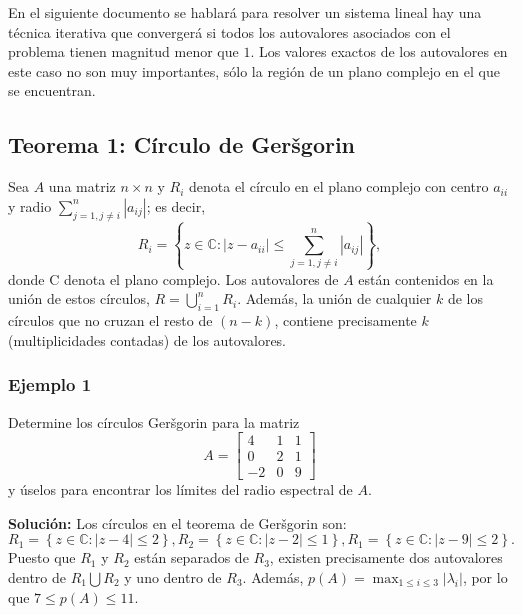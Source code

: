 \documentclass{report}
\numberwithin{subsection}{section} %
\begin{document}
En el siguiente documento se hablará para resolver un sistema lineal hay una técnica iterativa que convergerá si todos los autovalores asociados con el problema tienen magnitud menor que $ 1 $. Los valores exactos de los autovalores en este caso no son muy importantes, sólo la región de un plano complejo en el que se encuentran.

\subsection{\textnormal{Teorema 1: Círculo de Geršgorin}}

Sea $A$ una matriz $n\times n$ y $R_i$ denota el círculo en el plano complejo con centro $a_{ii}$ y radio $\sum_{j=1,j\neq i}^{n}\left| a_{ij} \right|$; es decir,
\begin{equation}
R_{i} = \left\{ z \in \mathbb{C} : \left| z - a_{ii} \right| \le \sum_{j=1,j\neq i}^{n}\left| a_{ij} \right| \right\},
\end{equation}
donde C denota el plano complejo. Los autovalores de $A$ están contenidos en la unión de estos círculos, $R=\bigcup_{i=1}^{n}R_{i}$. Además, la unión de cualquier $k$ de los círculos que no cruzan el resto de $\left( n - k \right)$, contiene precisamente $k$ (multiplicidades contadas) de los autovalores.

\subsubsection*{Ejemplo 1}

Determine los círculos Geršgorin para la matriz
\begin{equation*}
A =\begin{bmatrix}
4 & 1 & 1 \\
0 & 2 & 1 \\
-2 & 0 & 9
\end{bmatrix}
\end{equation*}
y úselos para encontrar los límites del radio espectral de $A$.

\textbf{Solución:} Los círculos en el teorema de Geršgorin son:
\begin{equation*}
R_{1} = \left\{ z \in \mathbb{C} : \left| z - 4 \right| \le 2 \right\}, R_{2} = \left\{ z \in \mathbb{C} : \left| z - 2 \right| \le 1 \right\}, R_{1} = \left\{ z \in \mathbb{C} : \left| z - 9 \right| \le 2 \right\}.
\end{equation*}
Puesto que $R_{1}$ y $R_{2}$ están separados de $R_{3}$, existen precisamente dos autovalores dentro de $R_{1}\bigcup R_{2}$ y uno dentro de $R_{3}$. Además, $p(A)= \max_{1\le i\le 3} \left| \lambda_{i} \right|$, por lo que $7 \le p(A) \le 11$.
\end{document}
